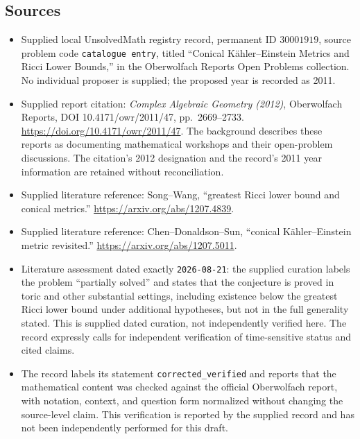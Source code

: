 \documentclass[11pt]{article}
\begin{document}
\subsection{Sources}
\begin{itemize}
\item Supplied local UnsolvedMath registry record, permanent ID \(30001919\), source problem code \texttt{catalogue entry}, titled ``Conical Kähler--Einstein Metrics and Ricci Lower Bounds,'' in the Oberwolfach Reports Open Problems collection. No individual proposer is supplied; the proposed year is recorded as 2011.
\item Supplied report citation: \emph{Complex Algebraic Geometry (2012)}, Oberwolfach Reports, DOI 10.4171/owr/2011/47, pp.\ 2669--2733. \url{https://doi.org/10.4171/owr/2011/47}. The background describes these reports as documenting mathematical workshops and their open-problem discussions. The citation's 2012 designation and the record's 2011 year information are retained without reconciliation.
\item Supplied literature reference: Song--Wang, ``greatest Ricci lower bound and conical metrics.'' \url{https://arxiv.org/abs/1207.4839}.
\item Supplied literature reference: Chen--Donaldson--Sun, ``conical Kähler--Einstein metric revisited.'' \url{https://arxiv.org/abs/1207.5011}.
\item Literature assessment dated exactly \texttt{2026-08-21}: the supplied curation labels the problem ``partially solved'' and states that the conjecture is proved in toric and other substantial settings, including existence below the greatest Ricci lower bound under additional hypotheses, but not in the full generality stated. This is supplied dated curation, not independently verified here. The record expressly calls for independent verification of time-sensitive status and cited claims.
\item The record labels its statement \texttt{corrected\_verified} and reports that the mathematical content was checked against the official Oberwolfach report, with notation, context, and question form normalized without changing the source-level claim. This verification is reported by the supplied record and has not been independently performed for this draft.
\end{itemize}
\end{document}
